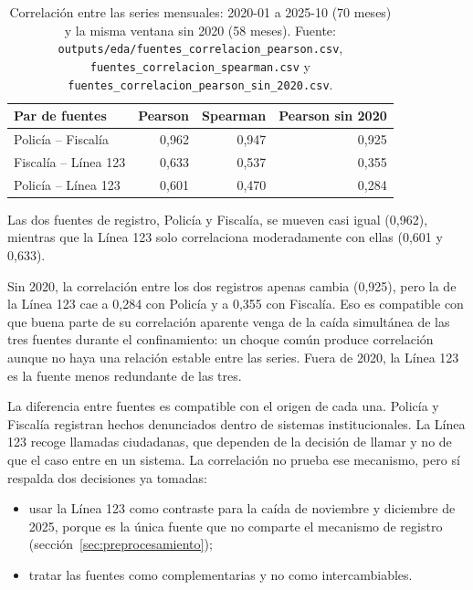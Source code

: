 \begin{table}[H]
\centering
\caption{Correlación entre las series mensuales: 2020-01 a 2025-10 (70 meses) y la misma ventana sin 2020 (58 meses). Fuente: \texttt{outputs/\allowbreak{}eda/\allowbreak{}fuentes\_\allowbreak{}correlacion\_\allowbreak{}pearson.csv}, \texttt{fuentes\_\allowbreak{}correlacion\_\allowbreak{}spearman.csv} y \texttt{fuentes\_\allowbreak{}correlacion\_\allowbreak{}pearson\_\allowbreak{}sin\_\allowbreak{}2020.csv}.}\label{tab:eda-corr}
\small
\begin{tabular}{@{}lrrr@{}}
\toprule
\textbf{Par de fuentes} & \textbf{Pearson} & \textbf{Spearman} & \textbf{Pearson sin 2020} \\
\midrule
Policía -- Fiscalía & 0,962 & 0,947 & 0,925 \\
Fiscalía -- Línea 123 & 0,633 & 0,537 & 0,355 \\
Policía -- Línea 123 & 0,601 & 0,470 & 0,284 \\
\bottomrule
\end{tabular}
\end{table}

Las dos fuentes de registro, Policía y Fiscalía, se mueven casi igual (0,962), mientras que la Línea 123 solo correlaciona moderadamente con ellas (0,601 y 0,633).

Sin 2020, la correlación entre los dos registros apenas cambia (0,925), pero la de la Línea 123 cae a 0,284 con Policía y a 0,355 con Fiscalía. Eso es compatible con que buena parte de su correlación aparente venga de la caída simultánea de las tres fuentes durante el confinamiento: un choque común produce correlación aunque no haya una relación estable entre las series. Fuera de 2020, la Línea 123 es la fuente menos redundante de las tres.

La diferencia entre fuentes es compatible con el origen de cada una. Policía y Fiscalía registran hechos denunciados dentro de sistemas institucionales. La Línea 123 recoge llamadas ciudadanas, que dependen de la decisión de llamar y no de que el caso entre en un sistema. La correlación no prueba ese mecanismo, pero sí respalda dos decisiones ya tomadas:
\begin{itemize}
  \item usar la Línea 123 como contraste para la caída de noviembre y diciembre de 2025, porque es la única fuente que no comparte el mecanismo de registro (sección~\ref{sec:preprocesamiento});
  \item tratar las fuentes como complementarias y no como intercambiables.
\end{itemize}

